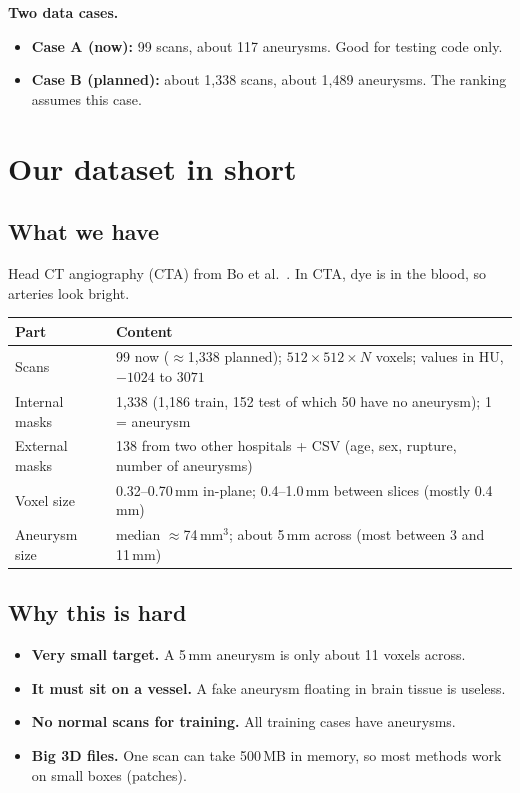 \documentclass[11pt,a4paper,oneside]{report}
\begin{document}
\textbf{Two data cases.}
\begin{itemize}
  \item \textbf{Case A (now):} 99 scans, about 117 aneurysms. Good for testing code only.
  \item \textbf{Case B (planned):} about 1{,}338 scans, about 1{,}489 aneurysms. The ranking assumes this case.
\end{itemize}

\clearpage{}
\chapter{Our dataset in short}\label{ch:intro}

\section{What we have}
Head CT angiography (CTA) from Bo et al.~\cite{bo2021}. In CTA, dye is in the blood, so arteries look bright.

\begin{center}
\begin{tabularx}{\linewidth}{lX}
\toprule
\textbf{Part} & \textbf{Content} \\
\midrule
Scans & 99 now ($\approx$1{,}338 planned); $512\times512\times N$ voxels; values in HU, $-1024$ to $3071$ \\
Internal masks & 1{,}338 (1{,}186 train, 152 test of which 50 have no aneurysm); 1 = aneurysm \\
External masks & 138 from two other hospitals + CSV (age, sex, rupture, number of aneurysms) \\
Voxel size & 0.32--0.70\,mm in-plane; 0.4--1.0\,mm between slices (mostly 0.4\,mm) \\
Aneurysm size & median $\approx$74\,mm$^3$; about 5\,mm across (most between 3 and 11\,mm) \\
\bottomrule
\end{tabularx}
\end{center}

\section{Why this is hard}
\begin{itemize}
  \item \textbf{Very small target.} A 5\,mm aneurysm is only about 11 voxels across.
  \item \textbf{It must sit on a vessel.} A fake aneurysm floating in brain tissue is useless.
  \item \textbf{No normal scans for training.} All training cases have aneurysms.
  \item \textbf{Big 3D files.} One scan can take 500\,MB in memory, so most methods work on small boxes (patches).
\end{itemize}
\end{document}
